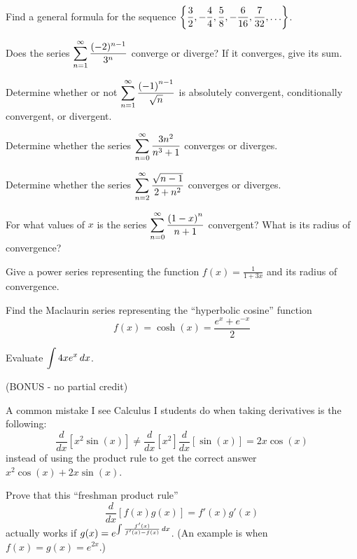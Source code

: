 \documentclass[12pt]{exam}
\newcommand{\ds}{\ensuremath{\displaystyle}}
\begin{document}
\begin{questions}

\setcounter{question}{0}

\question[10]
Find a general formula for the sequence
$
\ds \left\{
\frac{3}{2},
-\frac{4}{4},
\frac{5}{8},
-\frac{6}{16},
\frac{7}{32},
\ldots \right\}
$.

\vfill

\newpage

\question[10]
Does the series $\ds \sum_{n=1}^\infty \frac{(-2)^{n-1}}{3^n}$ converge or
diverge? If it converges, give its sum.

\vfill

\newpage

\question[10]
Determine whether or not
$\ds \sum_{n=1}^{\infty} \frac{\left(-1\right)^{n-1}}{\sqrt{n}}$
is absolutely convergent, conditionally convergent, or divergent.

\vfill

\newpage

\question[10]
Determine whether the series
$\ds \sum_{n = 0}^{\infty} \frac{3n^2}{n^3+1}$
converges or diverges.

\vfill

\newpage

\question[10]
Determine whether the series
$\ds \sum_{n = 2}^{\infty} \frac{\sqrt{n-1}}{2+n^2}$
converges or diverges.

\vfill

\newpage

\question[10]
For what values of $x$ is the series
$\ds \sum_{n=0}^{\infty} \frac{\left(1-x\right)^n}{n+1}$ convergent?
What is its radius of convergence?

\vfill

\newpage

\question[10]
Give a power series representing the function $f(x)=\frac{1}{1+3x}$ and
its radius of convergence.

\vfill

\newpage

\question[10]
Find the Maclaurin series representing the ``hyperbolic cosine'' function
\[f(x)=\cosh(x)=\frac{e^x+e^{-x}}{2}\]

\vfill

\newpage

\question[10]
Evaluate $\ds\int 4xe^x\,dx$.

\vfill

\newpage

\question[5] (BONUS - no partial credit)

A common mistake I see Calculus I students do when taking derivatives is
the following:
\[
  \frac{d}{dx}\left[x^2\sin(x)\right]
    \not=
  \frac{d}{dx}\left[x^2\right]\frac{d}{dx}\left[\sin(x)\right]
    =
  2x\cos(x)
\]
instead of using the product rule to get the correct answer
$x^2\cos(x)+2x\sin(x)$.

Prove that this ``freshman product rule''
\[
  \frac{d}{dx}\left[f(x)g(x)\right]
    =
  f'(x)g'(x)
\]
actually works if $\ds g(x)=e^{\int\frac{f'(x)}{f'(x)-f(x)}\,dx}$.
(An example is when $f(x)=g(x)=e^{2x}$.)




\end{questions}
\end{document}
